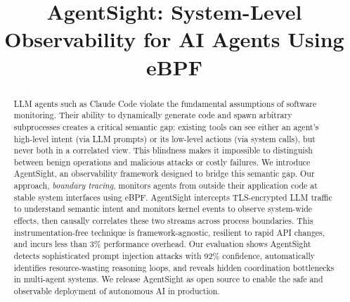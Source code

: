 \documentclass[sigplan,screen,review,9pt]{acmart}
\begin{document}
\title{AgentSight: System-Level Observability for AI Agents Using eBPF}


\author{}


\sloppy
\begin{abstract}
    LLM agents such as Claude Code violate the fundamental assumptions of software monitoring. Their ability to dynamically generate code and spawn arbitrary subprocesses creates a critical semantic gap: existing tools can see either an agent's high-level intent (via LLM prompts) or its low-level actions (via system calls), but never both in a correlated view. This blindness makes it impossible to distinguish between benign operations and malicious attacks or costly failures. We introduce AgentSight, an observability framework designed to bridge this semantic gap. Our approach, \emph{boundary tracing}, monitors agents from outside their application code at stable system interfaces using eBPF. AgentSight intercepts TLS-encrypted LLM traffic to understand semantic intent and monitors kernel events to observe system-wide effects, then causally correlates these two streams across process boundaries. This instrumentation-free technique is framework-agnostic, resilient to rapid API changes, and incurs less than 3\% performance overhead. Our evaluation shows AgentSight detects sophisticated prompt injection attacks with 92\% confidence, automatically identifies resource-wasting reasoning loops, and reveals hidden coordination bottlenecks in multi-agent systems. We release AgentSight as open source to enable the safe and observable deployment of autonomous AI in production.
\end{abstract}


\maketitle








\end{document}
